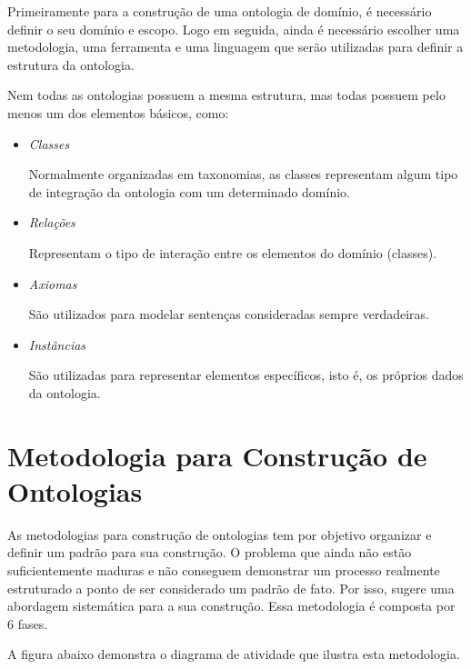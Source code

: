 Primeiramente para a construção de uma ontologia de domínio, é necessário definir
o seu domínio e escopo. Logo em seguida, ainda é necessário escolher uma 
metodologia, uma ferramenta e uma linguagem que serão utilizadas para definir a 
estrutura da ontologia. 

Nem todas as ontologias possuem a mesma estrutura, mas todas possuem pelo menos 
um dos elementos básicos, como:

\begin{itemize}
    \item \textit{Classes}
    
    Normalmente organizadas em taxonomias, as classes representam algum tipo de
    integração da ontologia com um determinado domínio.
    
    \item \textit{Relações}
    
    Representam o tipo de interação entre os elementos do domínio (classes).
    
    \item \textit{Axiomas}
    
    São utilizados para modelar sentenças consideradas sempre verdadeiras.
    
    \item \textit{Instâncias}
    
    São utilizadas para representar elementos específicos, isto é, os próprios 
    dados da ontologia.
\end{itemize}

\section{Metodologia para Construção de Ontologias}
\label{sec:metodologias_para_construcao_de_ontologias}

As metodologias para construção de ontologias tem por objetivo organizar e definir
um padrão para sua construção. O problema que ainda não estão suficientemente
maduras e não conseguem demonstrar um processo realmente estruturado a ponto de 
ser considerado um padrão de fato. Por isso, \cite{guizzardidesenvolvimento} 
sugere uma abordagem sistemática para a sua construção. Essa metodologia é 
composta por 6 fases.

A figura abaixo demonstra o diagrama de atividade que ilustra esta metodologia.

